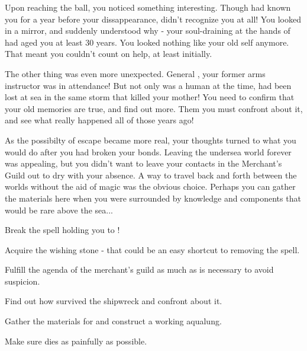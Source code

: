 \documentclass[char]{NeptuneBall}
\begin{document}
Upon reaching the ball, you noticed something interesting. Though \cAriel{} had known you for a year before your dissappearance, \cAriel{\they} didn't recognize you at all! You looked in a mirror, and suddenly understood why - your soul-draining at the hands of \cWitch{} had aged you at least 30 years. You looked nothing like your old self anymore. That meant you couldn't count on \cAriel{\their} help, at least initially.

The other thing was even more unexpected. General \cGeneral{}, your former arms instructor was in attendance! But not only was \cGeneral{\they} a human at the time, \cGeneral{\they} had been lost at sea in the same storm that killed your mother! You need to confirm that your old memories are true, and find out more. Them you must confront \cGeneral{\them} about it, and see what really happened all of those years ago!

As the possibilty of escape became more real, your thoughts turned to what you would do after you had broken your bonds. Leaving the undersea world forever was appealing, but you didn't want to leave your contacts in the Merchant's Guild out to dry with your absence. A way to travel back and forth between the worlds without the aid of magic was the obvious choice. Perhaps you can gather the materials here when you were surrounded by knowledge and components that would be rare above the sea...

\begin{itemz}[Goals]
	\item Break the spell holding you to \cWitch{}!
	\item Acquire the wishing stone - that could be an easy shortcut to removing the spell.
  \item Fulfill the agenda of the merchant's guild as much as is necessary to avoid suspicion.
	\item Find out how \cGeneral{} survived the shipwreck and confront \cGeneral{\them} about it.
	\item Gather the materials for and construct a working aqualung.
	\item Make sure \cWitch{} dies as painfully as possible.
\end{itemz}

\begin{contacts}
  \contact{}
\end{contacts}
\end{document}
